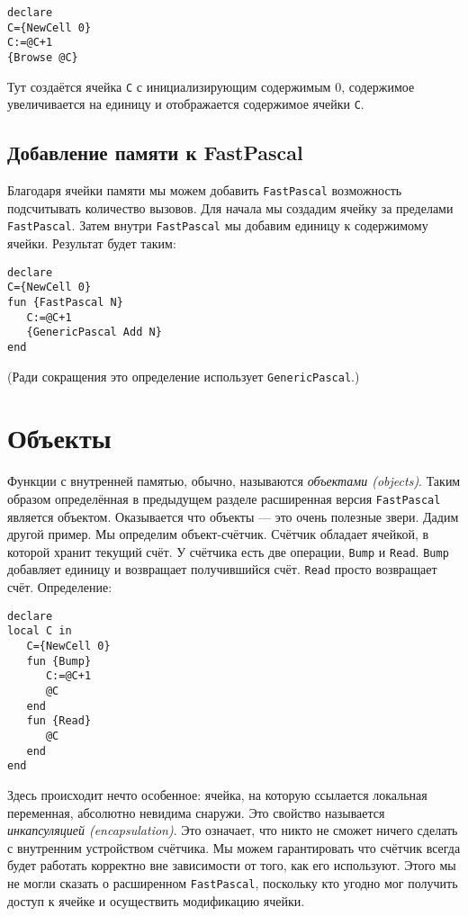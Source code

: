 \begin{lstlisting}
declare
C={NewCell 0}
C:=@C+1
{Browse @C}
\end{lstlisting}

Тут создаётся ячейка \lstinline|C| с инициализирующим содержимым $0$, содержимое увеличивается на единицу и отображается содержимое ячейки \lstinline|C|.

\subsection{Добавление памяти к FastPascal}

Благодаря ячейки памяти мы можем добавить \lstinline|FastPascal| возможность подсчитывать количество вызовов. Для начала мы создадим ячейку за пределами \lstinline|FastPascal|. Затем внутри \lstinline|FastPascal| мы добавим единицу к содержимому ячейки. Результат будет таким:

\begin{lstlisting}
declare
C={NewCell 0}
fun {FastPascal N}
   C:=@C+1
   {GenericPascal Add N}
end
\end{lstlisting}

(Ради сокращения это определение использует \lstinline|GenericPascal|.)

\section{Объекты}\label{section:objects}

Функции с внутренней памятью, обычно, называются \emph{объектами (objects)}. Таким образом определённая в предыдущем разделе расширенная версия \lstinline|FastPascal| является объектом. Оказывается что объекты --- это очень полезные звери. Дадим другой пример. Мы определим объект-счётчик. Счётчик обладает ячейкой, в которой хранит текущий счёт. У счётчика есть две операции, \lstinline|Bump| и \lstinline|Read|. \lstinline|Bump| добавляет единицу и возвращает получившийся счёт. \lstinline|Read| просто возвращает счёт. Определение:

\begin{lstlisting}
declare
local C in
   C={NewCell 0}
   fun {Bump}
      C:=@C+1
      @C
   end
   fun {Read}
      @C
   end
end
\end{lstlisting}

Здесь происходит нечто особенное: ячейка, на которую ссылается локальная переменная, абсолютно невидима снаружи. Это свойство называется \emph{инкапсуляцией (encapsulation)}. Это означает, что никто не сможет ничего сделать с внутренним устройством счётчика. Мы можем гарантировать что счётчик всегда будет работать корректно вне зависимости от того, как его используют. Этого мы не могли сказать о расширенном \lstinline|FastPascal|, поскольку кто угодно мог получить доступ к ячейке и осуществить модификацию ячейки.


